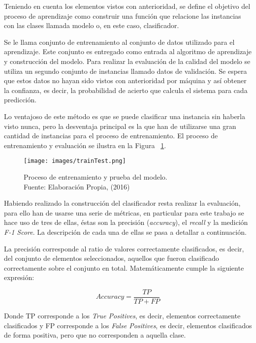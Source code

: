 Teniendo en cuenta los elementos vistos con anterioridad, se define el objetivo del proceso de aprendizaje como construir una función que relacione las instancias con las clases llamada modelo o, en este caso, clasificador.

Se le llama conjunto de entrenamiento al conjunto de datos utilizado para el aprendizaje. Este conjunto es entregado como entrada al algoritmo de aprendizaje y construcción del modelo. Para realizar la evaluación de la calidad del modelo se utiliza un segundo conjunto de instancias llamado datos de validación. Se espera que estos datos no hayan sido vistos con anterioridad por máquina y así obtener la confianza, es decir, la probabilidad de acierto que calcula el sistema para cada predicción.

Lo ventajoso de este método es que se puede clasificar una instancia sin haberla visto nunca, pero la desventaja principal es la que han de utilizarse una gran cantidad de instancias para el proceso de entrenamiento. El proceso de entrenamiento y evaluación se ilustra en la Figura ~\ref{fig:entrenamientoEvaluacion}.

\begin{figure}[H]
	\centering
	\captionsetup{justification=centering}
	\texttt{[image: images/trainTest.png]}
	\caption[Proceso de entrenamiento y prueba del modelo.]{Proceso de entrenamiento y prueba del modelo.\\Fuente: Elaboración Propia, (2016)}
	\label{fig:entrenamientoEvaluacion}
\end{figure}

Habiendo realizado la construcción del clasificador resta realizar la evaluación, para ello han de usarse una serie de métricas, en particular para este trabajo se hace uso de tres de ellas, éstas son la precisión (\textit{accuracy}), el \textit{recall} y la medición \textit{F-1 Score}. La descripción de cada una de ellas se pasa a detallar a continuación.

La precisión corresponde al ratio de valores correctamente clasificados, es decir, del conjunto de elementos seleccionados, aquellos que fueron clasificado correctamente sobre el conjunto en total. Matemáticamente cumple la siguiente expresión:

\[
	Accuracy = \frac{TP}{TP+FP}
\]

Donde TP corresponde a los \textit{True Positives}, es decir, elementos correctamente clasificados y FP corresponde a los \textit{False Positives}, es decir, elementos clasificados de forma positiva, pero que no corresponden a aquella clase.

